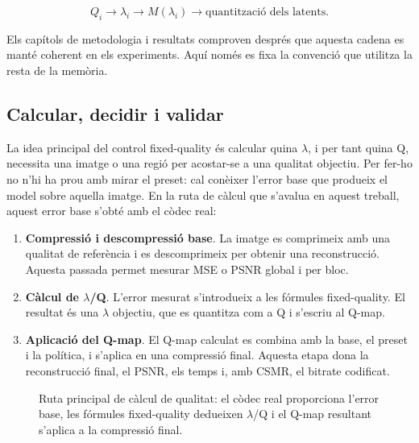 \begin{equation}
Q_i \longrightarrow \lambda_i \longrightarrow M(\lambda_i)
\longrightarrow \text{quantització dels latents}.
\end{equation}

Els capítols de metodologia i resultats comproven després que aquesta cadena es
manté coherent en els experiments. Aquí només es fixa la convenció que utilitza
la resta de la memòria.

\subsection{Calcular, decidir i validar}

La idea principal del control fixed-quality és calcular quina $\lambda$, i per
tant quina Q, necessita una imatge o una regió per acostar-se a una qualitat
objectiu. Per fer-ho no n'hi ha prou amb mirar el preset: cal conèixer l'error
base que produeix el model sobre aquella imatge. En la ruta de càlcul que
s'avalua en aquest treball, aquest error base s'obté amb el còdec real:

\begin{enumerate}[leftmargin=*]
  \item \textbf{Compressió i descompressió base}. La imatge es comprimeix amb
  una qualitat de referència i es descomprimeix per obtenir una reconstrucció.
  Aquesta passada permet mesurar MSE o PSNR global i per bloc.
  \item \textbf{Càlcul de $\lambda$/Q}. L'error mesurat s'introdueix a les
  fórmules fixed-quality. El resultat és una $\lambda$ objectiu, que es quantitza
  com a Q i s'escriu al Q-map.
  \item \textbf{Aplicació del Q-map}. El Q-map calculat es combina amb la base,
  el preset i la política, i s'aplica en una compressió final. Aquesta etapa dona
  la reconstrucció final, el PSNR, els temps i, amb CSMR, el bitrate codificat.
\end{enumerate}

\begin{figure}[H]
\centering
{}
\caption{Ruta principal de càlcul de qualitat: el còdec real proporciona l'error
base, les fórmules fixed-quality dedueixen $\lambda$/Q i el Q-map resultant
s'aplica a la compressió final.}
\label{fig:calibration_decision_validation}
\end{figure}

